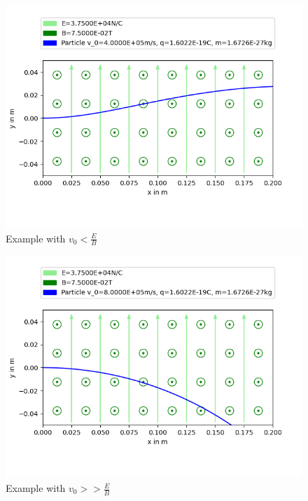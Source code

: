 \documentclass[english, a4paper, 10pt]{article}
\begin{document}
\begin{figure}[ht]
\caption{Example with $v_0<\frac{E}{B}$}
\centering
\includegraphics[width=\textwidth]{figure_2}
\end{figure}
\begin{figure}[ht]
\caption{Example with $v_0>>\frac{E}{B}$}
\centering
\includegraphics[width=\textwidth]{figure_4}
\end{figure}
\end{document}

